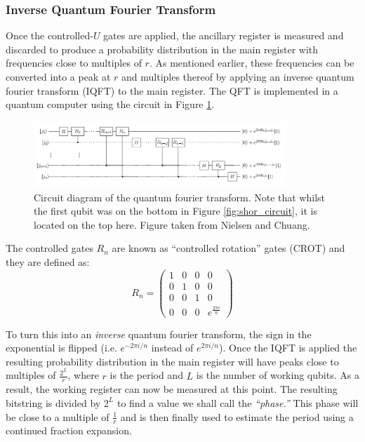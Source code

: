 \documentclass{article}[11pt]
\begin{document}
\subsubsection{Inverse Quantum Fourier Transform}
Once the controlled-$U$ gates are applied, the ancillary register is measured and discarded to produce a probability distribution in the main register with frequencies close to multiples of $r$. As mentioned earlier, these frequencies can be converted into a peak at $r$ and multiples thereof by applying an inverse quantum fourier transform (IQFT) to the main register. The QFT is implemented in a quantum computer using the circuit in Figure \ref{fig:IQFT}.\cite{nielsenChuang}
\begin{figure}[H]
    \centering
    \includegraphics[width=0.85\textwidth]{Pictures/qft_nc.png}
    \caption{Circuit diagram of the quantum fourier transform. Note that whilst the first qubit was on the bottom in Figure \ref{fig:shor_circuit}, it is located on the top here. Figure taken from Nielsen and Chuang.\cite{nielsenChuang}}
    \label{fig:IQFT}
\end{figure}

The controlled gates $R_n$ are known as ``controlled rotation'' gates (CROT) and they are defined as:\cite{nielsenChuang}
\begin{equation}
R_n=\begin{pmatrix}
1&0&0&0\\
0&1&0&0\\
0&0&1&0\\
0&0&0&e^{\frac{2 \pi i}{n}}
\end{pmatrix}
\end{equation}

To turn this into an \emph{inverse} quantum fourier transform, the sign in the exponential is flipped (i.e. $e^{-2\pi i/n}$ instead of $e^{2\pi i/n}$). Once the IQFT is applied the resulting probability distribution in the main register will have peaks close to multiples of $\frac{2^L}{r}$, where $r$ is the period and $L$ is the number of working qubits. As a result, the working register can now be measured at this point. The resulting bitstring is divided by $2^L$ to find a value we shall call the \emph{``phase.''} This phase will be close to a multiple of $\frac{1}{r}$ and is then finally used to estimate the period using a continued fraction expansion.\cite{candela}
\end{document}
